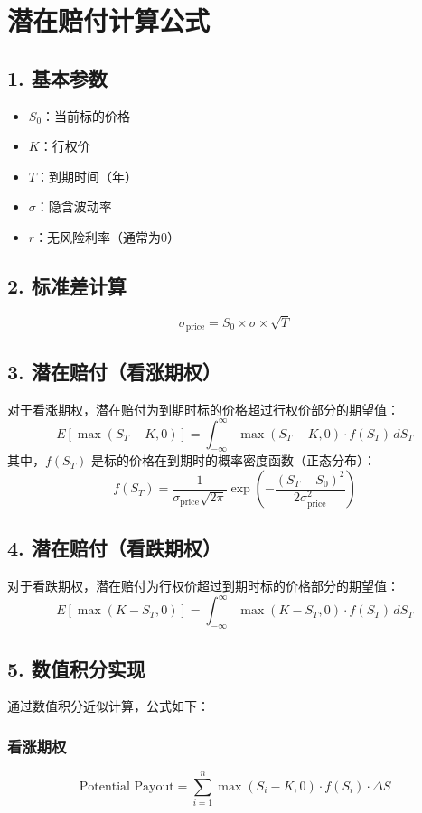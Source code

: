 \documentclass{article}
\begin{document}
\section{潜在赔付计算公式}

\subsection{1. 基本参数}
\begin{itemize}
    \item $S_0$：当前标的价格
    \item $K$：行权价
    \item $T$：到期时间（年）
    \item $\sigma$：隐含波动率
    \item $r$：无风险利率（通常为0）
\end{itemize}

\subsection{2. 标准差计算}
\[
\sigma_{\text{price}} = S_0 \times \sigma \times \sqrt{T}
\]

\subsection{3. 潜在赔付（看涨期权）}
对于看涨期权，潜在赔付为到期时标的价格超过行权价部分的期望值：
\[
E\left[\max(S_T - K, 0)\right] = \int_{-\infty}^{\infty} \max(S_T - K, 0) \cdot f(S_T) \, dS_T
\]
其中，$f(S_T)$ 是标的价格在到期时的概率密度函数（正态分布）：
\[
f(S_T) = \frac{1}{\sigma_{\text{price}} \sqrt{2\pi}} \exp\left(-\frac{(S_T - S_0)^2}{2\sigma_{\text{price}}^2}\right)
\]

\subsection{4. 潜在赔付（看跌期权）}
对于看跌期权，潜在赔付为行权价超过到期时标的价格部分的期望值：
\[
E\left[\max(K - S_T, 0)\right] = \int_{-\infty}^{\infty} \max(K - S_T, 0) \cdot f(S_T) \, dS_T
\]

\subsection{5. 数值积分实现}
通过数值积分近似计算，公式如下：

\subsubsection{看涨期权}
\[
\text{Potential Payout} = \sum_{i=1}^{n} \max(S_i - K, 0) \cdot f(S_i) \cdot \Delta S
\]
\end{document}
